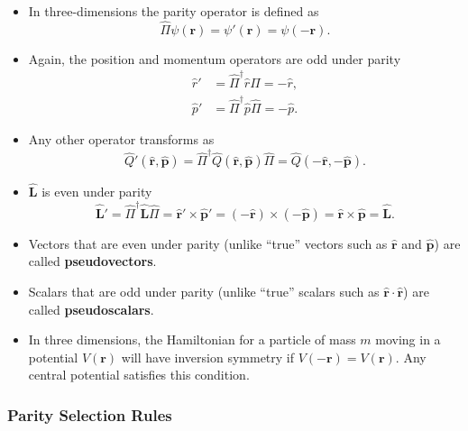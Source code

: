\documentclass{article}
\renewcommand{\vec}[1]{\boldsymbol{\mathbf{#1}}}
\newcommand{\uvec}[1]{\hat{\vec{#1}}}
\begin{document}
\begin{itemize}
  \item In three-dimensions the parity operator is defined as \[\hat{\Pi} \psi(\vec{r}) = \psi'(\vec{r}) = \psi(-\vec{r}).\]

  \item Again, the position and momentum operators are odd under parity \begin{align*}
          \hat{r}' & = \hat{\Pi}^\dagger \hat{r} \hat{\Pi} = -\hat{r}, \\
          \hat{p}' & = \hat{\Pi}^\dagger \hat{p} \hat{\Pi} = -\hat{p}.
        \end{align*}

  \item Any other operator transforms as \[\hat{Q}'(\uvec{r}, \uvec{p}) = \hat{\Pi}^\dagger \hat{Q}(\uvec{r}, \uvec{p}) \hat{\Pi} = \hat{Q}(-\uvec{r}, -\uvec{p}).\]

  \item $\uvec{L}$ is even under parity \[\uvec{L}' = \hat{\Pi}^\dagger \uvec{L} \hat{\Pi} = \uvec{r}' \times \uvec{p}' = (-\uvec{r}) \times (-\uvec{p}) = \uvec{r} \times \uvec{p} = \uvec{L}.\]

  \item Vectors that are even under parity (unlike ``true'' vectors such as $\uvec{r}$ and $\uvec{p}$) are called \textbf{pseudovectors}.

  \item Scalars that are odd under parity (unlike ``true'' scalars such as $\uvec{r} \cdot \uvec{r}$) are called \textbf{pseudoscalars}.

  \item In three dimensions, the Hamiltonian for a particle of mass $m$ moving in a potential $V(\vec{r})$ will have inversion symmetry if $V(-\vec{r}) = V(\vec{r})$. Any central potential satisfies this condition.
\end{itemize}

\subsubsection{Parity Selection Rules}
\end{document}
